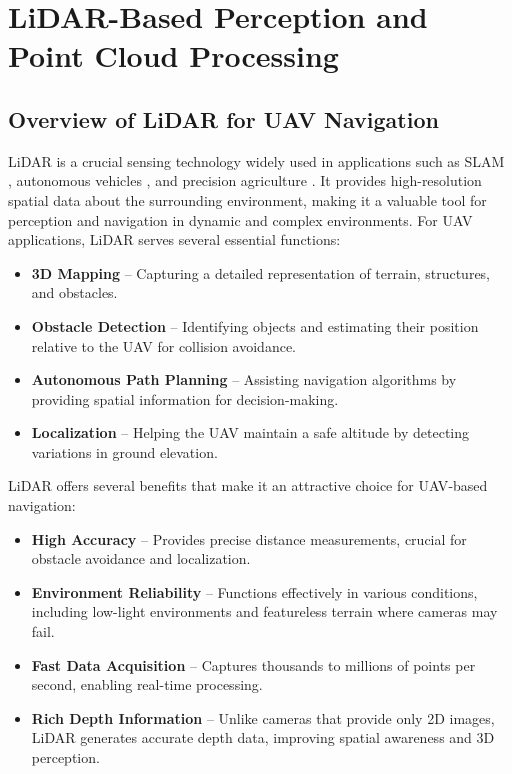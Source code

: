     \section{LiDAR-Based Perception and Point Cloud Processing}
    \label{sec:lidar_perception}
        \subsection{Overview of LiDAR for UAV Navigation}
            \ac{LiDAR} is a crucial sensing technology widely used in applications such as \ac{SLAM} \cite{point_lio_paper}, autonomous vehicles \cite{Lidar_autonomous_vehicles}, and precision agriculture \cite{Lidar_agriculture}. 
            It provides high-resolution spatial data about the surrounding environment, making it a valuable tool for perception and navigation in dynamic and complex environments.  
            For \ac{UAV} applications, \ac{LiDAR} serves several essential functions:  
            \begin{itemize}  
                \item \textbf{3D Mapping} -- Capturing a detailed representation of terrain, structures, and obstacles.  
                \item \textbf{Obstacle Detection} -- Identifying objects and estimating their position relative to the \ac{UAV} for collision avoidance.  
                \item \textbf{Autonomous Path Planning} -- Assisting navigation algorithms by providing spatial information for decision-making.  
                \item \textbf{Localization} -- Helping the \ac{UAV} maintain a safe altitude by detecting variations in ground elevation.  
            \end{itemize}  
            \ac{LiDAR} offers several benefits that make it an attractive choice for \ac{UAV}-based navigation:  
            \begin{itemize}  
                \item \textbf{High Accuracy} -- Provides precise distance measurements, crucial for obstacle avoidance and localization.  
                \item \textbf{Environment Reliability} -- Functions effectively in various conditions, including low-light environments and featureless terrain where cameras may fail.  
                \item \textbf{Fast Data Acquisition} -- Captures thousands to millions of points per second, enabling real-time processing.  
                \item \textbf{Rich Depth Information} -- Unlike cameras that provide only 2D images, \ac{LiDAR} generates accurate depth data, improving spatial awareness and 3D perception.  
            \end{itemize}  
